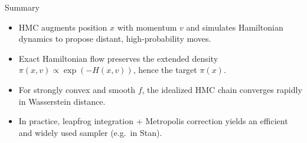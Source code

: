 \documentclass{beamer}
\begin{document}
\begin{frame}{Summary}
  \begin{itemize}
    \item HMC augments position $x$ with momentum $v$ and simulates Hamiltonian dynamics
          to propose distant, high-probability moves.
    \item Exact Hamiltonian flow preserves the extended density
          $\pi(x,v) \propto \exp(-H(x,v))$, hence the target $\pi(x)$.
    \item For strongly convex and smooth $f$, the idealized HMC chain converges
          rapidly in Wasserstein distance.
    \item In practice, leapfrog integration + Metropolis correction yields
          an efficient and widely used sampler (e.g.\ in Stan).
  \end{itemize}
\end{frame}

 
\end{document}
